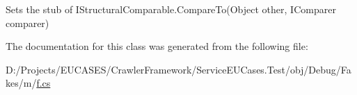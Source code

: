 Sets the stub of I\-Structural\-Comparable.\-Compare\-To(\-Object other, I\-Comparer comparer)



The documentation for this class was generated from the following file\-:\begin{DoxyCompactItemize}
\item 
D\-:/\-Projects/\-E\-U\-C\-A\-S\-E\-S/\-Crawler\-Framework/\-Service\-E\-U\-Cases.\-Test/obj/\-Debug/\-Fakes/m/\hyperlink{m_2f_8cs}{f.\-cs}\end{DoxyCompactItemize}
